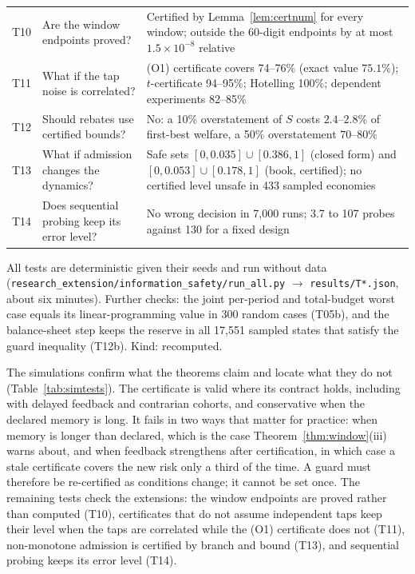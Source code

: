 \begin{table}[!tbp]
\begin{threeparttable}
\begin{tabular}{p{}p{}p{}}
T10 & Are the window endpoints proved? & Certified by Lemma~\ref{lem:certnum} for every window; outside the 60-digit endpoints by at most $1.5\times10^{-8}$ relative\\
T11 & What if the tap noise is correlated? & (O1) certificate covers 74--76\% (exact value $75.1\%$); $t$-certificate 94--95\%; Hotelling 100\%; dependent experiments 82--85\%\\
T12 & Should rebates use certified bounds? & No: a 10\% overstatement of $S$ costs $2.4$--$2.8\%$ of first-best welfare, a 50\% overstatement $70$--$80\%$\\
T13 & What if admission changes the dynamics? & Safe sets $[0,0.035]\cup[0.386,1]$ (closed form) and $[0,0.053]\cup[0.178,1]$ (book, certified); no certified level unsafe in 433 sampled economies\\
T14 & Does sequential probing keep its error level? & No wrong decision in 7{,}000 runs; 3.7 to 107 probes against 130 for a fixed design\\
\bottomrule
\end{tabular}
\begin{tablenotes}\footnotesize\item All tests are deterministic given their seeds and run without data (\texttt{research\_extension/information\_safety/run\_all.py} $\to$ \texttt{results/T*.json}, about six minutes). Further checks: the joint per-period and total-budget worst case equals its linear-programming value in 300 random cases (T05b), and the balance-sheet step keeps the reserve in all 17{,}551 sampled states that satisfy the guard inequality (T12b). Kind: recomputed. \end{tablenotes}
\end{threeparttable}
\end{table}

The simulations confirm what the theorems claim and locate what they do not (Table~\ref{tab:simtests}). The certificate is valid where its contract holds, including with delayed feedback and contrarian cohorts, and conservative when the declared memory is long. It fails in two ways that matter for practice: when memory is longer than declared, which is the case Theorem~\ref{thm:window}(iii) warns about, and when feedback strengthens after certification, in which case a stale certificate covers the new risk only a third of the time. A guard must therefore be re-certified as conditions change; it cannot be set once. The remaining tests check the extensions: the window endpoints are proved rather than computed (T10), certificates that do not assume independent taps keep their level when the taps are correlated while the (O1) certificate does not (T11), non-monotone admission is certified by branch and bound (T13), and sequential probing keeps its error level (T14).

